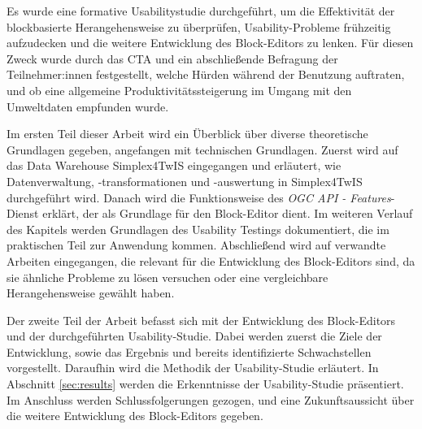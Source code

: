 Es wurde eine formative Usabilitystudie durchgeführt, um die Effektivität der blockbasierte Herangehensweise zu überprüfen, Usability-Probleme frühzeitig aufzudecken und die weitere Entwicklung des Block-Editors zu lenken. Für diesen Zweck wurde durch das \acf{CTA} und ein abschließende Befragung der Teilnehmer:innen festgestellt, welche Hürden während der Benutzung auftraten, und ob eine allgemeine Produktivitätssteigerung im Umgang mit den Umweltdaten empfunden wurde.

\pskip
Im ersten Teil dieser Arbeit wird ein Überblick über diverse theoretische Grundlagen gegeben, angefangen mit technischen Grundlagen. Zuerst wird auf das Data Warehouse Simplex4TwIS eingegangen und erläutert, wie Datenverwaltung, -transformationen und -auswertung in Simplex4TwIS durchgeführt wird. Danach wird die Funktionsweise des \textit{OGC API - Features}-Dienst erklärt, der als Grundlage für den Block-Editor dient. Im weiteren Verlauf des Kapitels werden Grundlagen des Usability Testings dokumentiert, die im praktischen Teil zur Anwendung kommen. Abschließend wird auf verwandte Arbeiten eingegangen, die relevant für die Entwicklung des Block-Editors sind, da sie ähnliche Probleme zu lösen versuchen oder eine vergleichbare Herangehensweise gewählt haben.

Der zweite Teil der Arbeit befasst sich mit der Entwicklung des Block-Editors und der durchgeführten Usability-Studie. Dabei werden zuerst die Ziele der Entwicklung, sowie das Ergebnis und bereits identifizierte Schwachstellen vorgestellt. Daraufhin wird die Methodik der Usability-Studie erläutert. In Abschnitt \ref{sec:results} werden die Erkenntnisse der Usability-Studie präsentiert. Im Anschluss werden Schlussfolgerungen gezogen, und eine Zukunftsaussicht über die weitere Entwicklung des Block-Editors gegeben.
